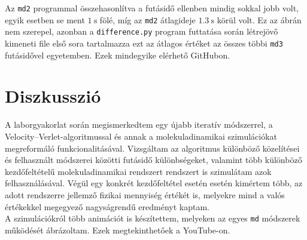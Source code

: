 \begin{multicols}{2}
Az \texttt{md2} programmal összehasonlítva a futásidő ellenben mindig sokkal jobb volt, egyik esetben se ment $1\ \text{s}$ fölé, míg az \texttt{md2} átlagideje $1.3\ \text{s}$ körül volt. Ez az ábrán nem szerepel, azonban a \texttt{difference.py} program futtatása során létrejövő kimeneti file első sora tartalmazza ezt az átlagos értéket az összes többi \texttt{md3} futásidővel egyetemben. Ezek mindegyike elérhető GitHubon\cite{github}.

\section{Diszkusszió} \label{sec:7}
A laborgyakorlat során megismerkedtem egy újabb iteratív módszerrel, a Velocity--Verlet-algoritmussal és annak a molekuladinamikai szimulációkat megreformáló funkcionalitásával. Vizsgáltam az algoritmus különböző közelítései és felhasznált módszerei közötti futásidő különbségeket, valamint több különböző kezdőfeltételű molekuladinamikai rendszert rendszert is szimulátam azok felhasználásával. Végül egy konkrét kezdőfeltétel esetén esetén kimértem több, az adott rendszerre jellemző fizikai mennyiség értékét is, melyekre mind a valós értékekkel megegyező nagyságrendű eredményt kaptam. \\
A szimulációkról több animációt is készítettem, melyeken az egyes \texttt{md} módszerek működését ábrázoltam. Ezek megtekinthetőek a YouTube-on\cite{yt}.

\end{multicols}